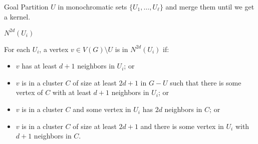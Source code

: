 \begin{frame}{}
    \begin{block}{Goal}
        Partition $U$ in monochromatic sets $\{U_1, \dots, U_\ell\}$ and merge them until we get a kernel.
    \end{block}
\end{frame}

\begin{frame}{$N^{2d}(U_i)$}
    \vspace{-0.3cm}
    \begin{block}{}
        For each $U_i$, a vertex $v \in V(G) \setminus U$ is in $N^{2d}(U_i)$ if:
        \begin{itemize}
            \item<2->[1] $v$ has at least $d+1$ neighbors in $U_i$; or
            \item<3->[2] $v$ is in a cluster $C$ of size at least $2d+1$ in $G - U$ such that there is some vertex of $C$ with at least $d+1$ neighbors in $U_i$; or
            \item<4->[3] $v$ is in a cluster $C$ and some vertex in $U_i$ has $2d$ neighbors in $C$; or
            \item<5->[4] $v$ is in a cluster $C$ of size at least $2d+1$ and there is some vertex in $U_i$ with $d+1$ neighbors in $C$.
        \end{itemize}
    \end{block}
    \begin{figure}[!htb]
        \centering
        \hspace*{1cm}
\end{figure}
\end{frame}
